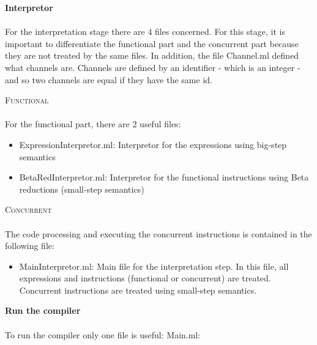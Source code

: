 \documentclass[11pt]{report}
\begin{document}
{} 
\tabto{0cm} {\LARGE \textbf{Interpretor}}
\\ \\
For the interpretation stage there are 4 files concerned. For this stage, it is important to differentiate the functional part and the concurrent part because they are not treated by the same files. In addition, the file Channel.ml defined what channels are. Channels are defined by an identifier - which is an integer - and so two channels are equal if they have the same id.
\vspace*{10pt}
{}
\tabto{1cm} {\Large \textsc{Functional}} \\ \\
For the functional part, there are 2 useful files:
\begin{itemize}
\item ExpressionInterpretor.ml: Interpretor for the expressions using big-step semantics
\item BetaRedInterpretor.ml: Interpretor for the functional instructions using Beta reductions (small-step semantics)
\end{itemize}

{} 
\tabto{1cm} {\Large \textsc{Concurrent}}
\\ \\
The code processing and executing the concurrent instructions is contained in the following file:
\begin{itemize}
\item MainInterpretor.ml: Main file for the interpretation step. In this file, all expressions and instructions (functional or concurrent) are treated. Concurrent instructions are treated using small-step semantics.
\end{itemize}


{}
\tabto{0cm} {\LARGE \textbf{Run the compiler}}
\\ \\
To run the compiler only one file is useful: Main.ml: \\ 
\end{document}
